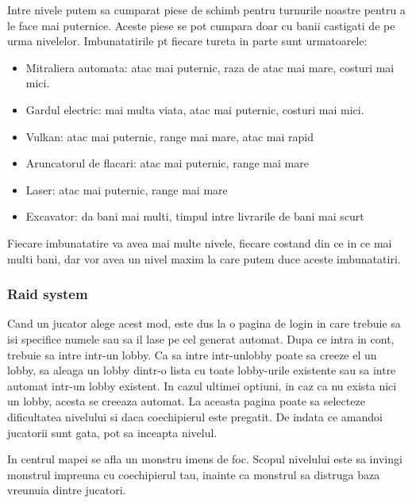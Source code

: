 \documentclass[12pt, a4paper]{article}
\begin{document}
	Intre nivele putem sa cumparat piese de schimb pentru turnurile noastre pentru a le face mai puternice. Aceste piese se pot cumpara doar cu banii castigati de pe urma nivelelor. Imbunatatirile pt fiecare tureta in parte sunt urmatoarele:
	
	\begin{itemize}
		\item Mitraliera automata: atac mai puternic, raza de atac mai mare, costuri mai mici.
		\item Gardul electric: mai multa viata, atac mai puternic, costuri mai mici.
		\item Vulkan: atac mai puternic, range mai mare, atac mai rapid
		\item Aruncatorul de flacari: atac mai puternic, range mai mare
		\item Laser: atac mai puternic, range mai mare
		\item Excavator: da bani mai multi, timpul intre livrarile de bani mai scurt
	\end{itemize}
	
	Fiecare imbunatatire va avea mai multe nivele, fiecare costand din ce in ce mai multi bani, dar vor avea un nivel maxim la care putem duce aceste imbunatatiri.
	
	
	
	
	
	\subsubsection{Raid system}
	
	Cand un jucator alege acest mod, este dus la o pagina de login in care trebuie sa isi specifice numele sau sa il lase pe cel generat automat. Dupa ce intra in cont, trebuie sa intre intr-un lobby. Ca sa intre intr-unlobby poate sa creeze el un lobby, sa aleaga un lobby dintr-o lista cu toate lobby-urile existente sau sa intre automat intr-un lobby existent. In cazul ultimei optiuni, in caz ca nu exista nici un lobby, acesta se creeaza automat. La aceasta pagina poate sa selecteze dificultatea nivelului si daca coechipierul este pregatit. De indata ce amandoi jucatorii sunt gata, pot sa inceapta nivelul.
	\newline
	
	In centrul mapei se afla un monstru imens de foc. Scopul nivelului este sa invingi monstrul impreuna cu coechipierul tau, inainte ca monstrul sa distruga baza vreunuia dintre jucatori.
	\newline
\end{document}
